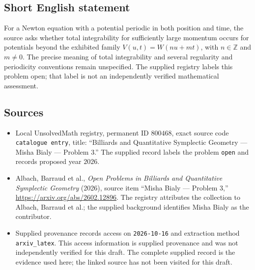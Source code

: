 \documentclass[11pt]{article}
\newcommand{\Z}{\mathbb{Z}}
\begin{document}
\subsection{Short English statement}
For a Newton equation with a potential periodic in both position and time, the source asks whether total integrability for sufficiently large momentum occurs for potentials beyond the exhibited family \(V(u,t)=W(nu+mt)\), with \(n\in\Z\) and \(m\ne0\). The precise meaning of total integrability and several regularity and periodicity conventions remain unspecified. The supplied registry labels this problem open; that label is not an independently verified mathematical assessment.
\subsection{Sources}
\begin{itemize}
\item Local UnsolvedMath registry, permanent ID \(800468\), exact source code \texttt{catalogue entry}, title: ``Billiards and Quantitative Symplectic Geometry --- Misha Bialy --- Problem 3.'' The supplied record labels the problem \texttt{open} and records proposed year \(2026\).
\item Albach, Barraud et al., \emph{Open Problems in Billiards and Quantitative Symplectic Geometry} (2026), source item ``Misha Bialy --- Problem 3,'' \url{https://arxiv.org/abs/2602.12896}. The registry attributes the collection to Albach, Barraud et al.; the supplied background identifies Misha Bialy as the contributor.
\item Supplied provenance records access on \texttt{2026-10-16} and extraction method \texttt{arxiv\_latex}. This access information is supplied provenance and was not independently verified for this draft. The complete supplied record is the evidence used here; the linked source has not been visited for this draft.
\end{itemize}
\end{document}
